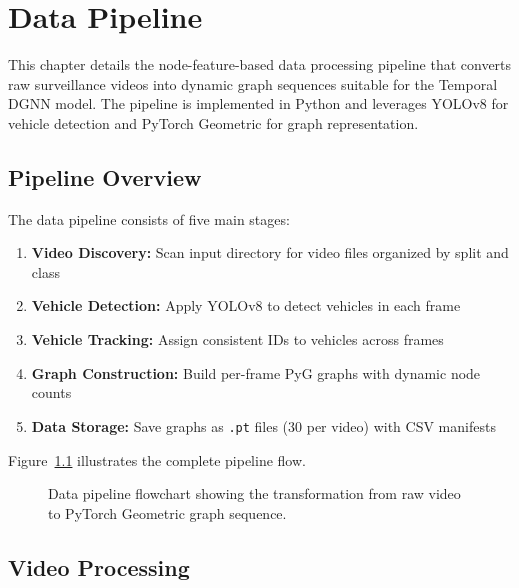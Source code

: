 
\chapter{Data Pipeline}
\label{ch:data_pipeline}

This chapter details the node-feature-based data processing pipeline that converts raw surveillance videos into dynamic graph sequences suitable for the Temporal DGNN model. The pipeline is implemented in Python and leverages YOLOv8 for vehicle detection and PyTorch Geometric for graph representation.

\section{Pipeline Overview}

The data pipeline consists of five main stages:

\begin{enumerate}
    \item \textbf{Video Discovery:} Scan input directory for video files organized by split and class
    \item \textbf{Vehicle Detection:} Apply YOLOv8 to detect vehicles in each frame
    \item \textbf{Vehicle Tracking:} Assign consistent IDs to vehicles across frames
    \item \textbf{Graph Construction:} Build per-frame PyG graphs with dynamic node counts
    \item \textbf{Data Storage:} Save graphs as \texttt{.pt} files (30 per video) with CSV manifests
\end{enumerate}

Figure~\ref{fig:pipeline_flow} illustrates the complete pipeline flow.

\begin{figure}[H]
    \centering
    
    \caption{Data pipeline flowchart showing the transformation from raw video to PyTorch Geometric graph sequence.}
    \label{fig:pipeline_flow}
\end{figure}

\section{Video Processing}

